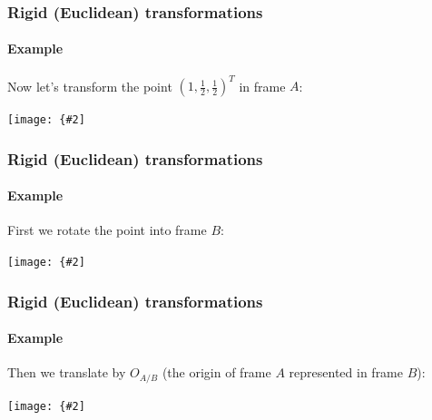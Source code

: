\documentclass[aspectratio=169]{beamer}
\newcommand{\myfig}[3]{\centerline{\texttt{[image: \{\#2]}}}
\begin{document}
\begin{frame}
\frametitle{Rigid (Euclidean) transformations}
\framesubtitle{Example}

Now let's transform the point $(1,\frac{1}{2},\frac{1}{2})^T$ in frame
$A$:

\myfig{2.5in}{rigid-1}{}

\end{frame}

\begin{frame}
\frametitle{Rigid (Euclidean) transformations}
\framesubtitle{Example}

First we rotate the point into frame $B$:

\myfig{2.8in}{rigid-2}{}

\end{frame}

\begin{frame}
\frametitle{Rigid (Euclidean) transformations}
\framesubtitle{Example}

Then we translate by $O_{A/B}$ (the origin of frame $A$ represented in
frame $B$):

\myfig{2.8in}{rigid-3}{}

\end{frame}
\end{document}

